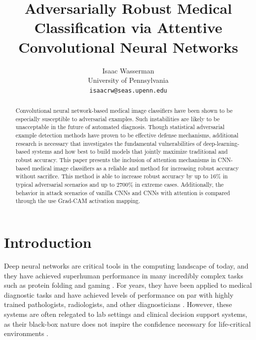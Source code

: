 \documentclass[10pt,twocolumn,letterpaper]{article}
\begin{document}
\title{Adversarially Robust Medical Classification via Attentive Convolutional Neural Networks}

\author{Isaac Wasserman\\
  University of Pennsylvania\\
  {\tt\small isaacrw@seas.upenn.edu}
}
\maketitle

\begin{abstract}
  Convolutional neural network-based medical image classifiers have been shown to be especially susceptible to adversarial examples. Such instabilities are likely to be unacceptable in the future of automated diagnosis. Though statistical adversarial example detection methods have proven to be effective defense mechanisms, additional research is necessary that investigates the fundamental vulnerabilities of deep-learning-based systems and how best to build models that jointly maximize traditional and robust accuracy. This paper presents the inclusion of attention mechanisms in CNN-based medical image classifiers as a reliable and method for increasing robust accuracy without sacrifice. This method is able to increase robust accuracy by up to 16\% in typical adversarial scenarios and up to 2700\% in extreme cases. Additionally, the behavior in attack scenarios of vanilla CNNs and CNNs with attention is compared through the use Grad-CAM activation mapping.
\end{abstract}

\section{Introduction}
  Deep neural networks are critical tools in the computing landscape of today, and they have achieved superhuman performance in many incredibly complex tasks such as protein folding \cite{alphafold} and gaming \cite{muzero}. For years, they have been applied to medical diagnostic tasks and have achieved levels of performance on par with highly trained pathologists, radiologists, and other diagnosticians \cite{medical-cnn-survey}. However, these systems are often relegated to lab settings and clinical decision support systems, as their black-box nature does not inspire the confidence necessary for life-critical environments \cite{NIH-AI}\cite{AI-CDSS}.
  
\end{document}
